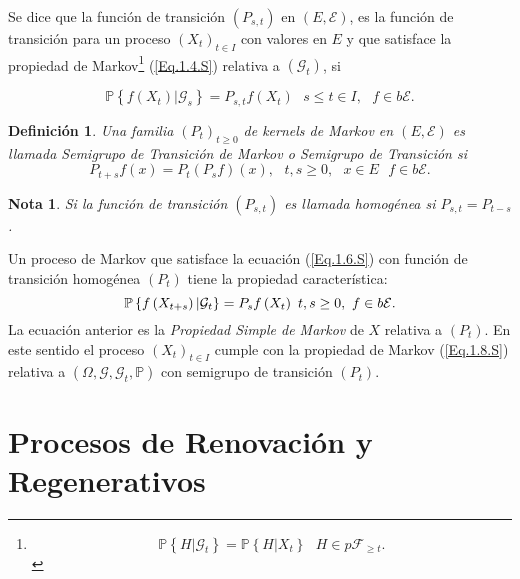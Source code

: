 \documentclass{article}
\newtheorem{Def}{Definición}[section]
\newtheorem{Note}{Nota}[section]
\newcommand{\prob}{\mathbb{P}}
\newcommand{\ER}{\left(E,\mathcal{E}\right)}
\newcommand{\KM}{\left(P_{s,t}\right)}
\newcommand{\PE}{\left(X_{t}\right)_{t\in I}}
\numberwithin{equation}{section}
\begin{document}
Se dice que la funci\'on de transici\'on $\KM$ en $\ER$, es la funci\'on de transici\'on para un proceso $\PE$  con valores en $E$ y que satisface la propiedad de Markov\footnote{\begin{equation}\label{Eq.1.4.S}
\prob\left\{H|\mathcal{G}_{t}\right\}=\prob\left\{H|X_{t}\right\}\textrm{ }H\in p\mathcal{F}_{\geq t}.
\end{equation}} (\ref{Eq.1.4.S}) relativa a $\left(\mathcal{G}_{t}\right)$, si

\begin{equation}\label{Eq.1.6.S}
\prob\left\{f\left(X_{t}\right)|\mathcal{G}_{s}\right\}=P_{s,t}f\left(X_{t}\right)\textrm{ }s\leq t\in I,\textrm{ }f\in b\mathcal{E}.
\end{equation}

\begin{Def}
Una familia $\left(P_{t}\right)_{t\geq0}$ de kernels de Markov en $\ER$ es llamada {\em Semigrupo de Transici\'on de Markov} o {\em Semigrupo de Transici\'on} si
\[P_{t+s}f\left(x\right)=P_{t}\left(P_{s}f\right)\left(x\right),\textrm{ }t,s\geq0,\textrm{ }x\in E\textrm{ }f\in b\mathcal{E}.\]
\end{Def}
\begin{Note}
Si la funci\'on de transici\'on $\KM$ es llamada homog\'enea si $P_{s,t}=P_{t-s}$.
\end{Note}

Un proceso de Markov que satisface la ecuaci\'on (\ref{Eq.1.6.S}) con funci\'on de transici\'on homog\'enea $\left(P_{t}\right)$ tiene la propiedad caracter\'istica:
\begin{equation}\label{Eq.1.8.S}\index{Propiedad Simple de Markov}
\prob\left\{f\left(X_{t+s}\right)|\mathcal{G}_{t}\right\}=P_{s}f\left(X_{t}\right)\textrm{ }t,s\geq0,\textrm{ }f\in b\mathcal{E}.
\end{equation}
La ecuaci\'on anterior es la {\em Propiedad Simple de Markov} de $X$ relativa a $\left(P_{t}\right)$. En este sentido el proceso $\PE$ cumple con la propiedad de Markov (\ref{Eq.1.8.S}) relativa a $\left(\Omega,\mathcal{G},\mathcal{G}_{t},\prob\right)$ con semigrupo de transici\'on $\left(P_{t}\right)$.

\section{Procesos de Renovaci\'on y Regenerativos}\label{Procesos.Regenerativos.Estacionarios}
\end{document}
